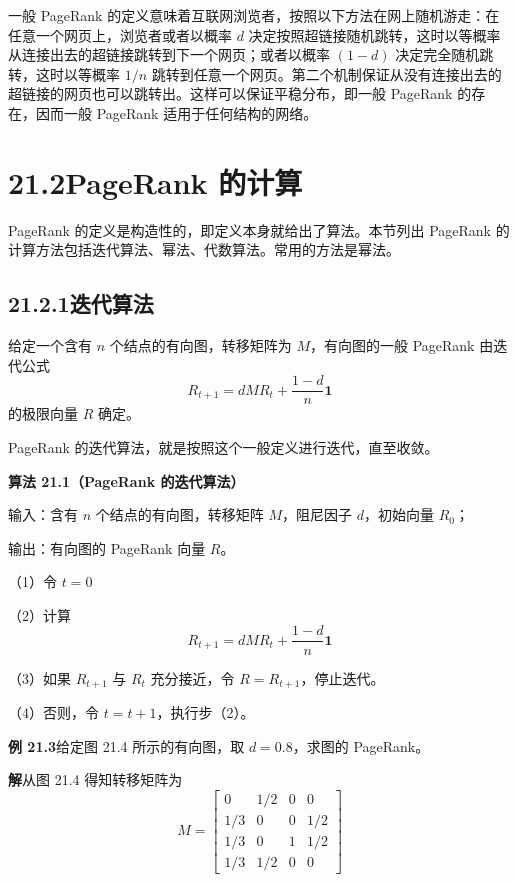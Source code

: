 \documentclass[UTF8,12pt,a4paper,fontset=fandol]{ctexart}
\begin{document}
一般 PageRank 的定义意味着互联网浏览者，按照以下方法在网上随机游走：在任意一个网页上，浏览者或者以概率 $d$ 决定按照超链接随机跳转，这时以等概率从连接出去的超链接跳转到下一个网页；或者以概率 $(1-d)$ 决定完全随机跳转，这时以等概率 $1/n$ 跳转到任意一个网页。第二个机制保证从没有连接出去的超链接的网页也可以跳转出。这样可以保证平稳分布，即一般 PageRank 的存在，因而一般 PageRank 适用于任何结构的网络。

\section*{21.2\quad PageRank 的计算}

PageRank 的定义是构造性的，即定义本身就给出了算法。本节列出 PageRank 的计算方法包括迭代算法、幂法、代数算法。常用的方法是幂法。

\subsection*{21.2.1\quad 迭代算法}

给定一个含有 $n$ 个结点的有向图，转移矩阵为 $M$，有向图的一般 PageRank 由迭代公式
\begin{equation}
R_{t+1}=dMR_t+\frac{1-d}{n}\mathbf{1}
\tag{21.15}
\end{equation}
的极限向量 $R$ 确定。

PageRank 的迭代算法，就是按照这个一般定义进行迭代，直至收敛。

\noindent\textbf{算法 21.1（PageRank 的迭代算法）}

输入：含有 $n$ 个结点的有向图，转移矩阵 $M$，阻尼因子 $d$，初始向量 $R_0$；

输出：有向图的 PageRank 向量 $R$。

（1）令 $t=0$

（2）计算
\[
R_{t+1}=dMR_t+\frac{1-d}{n}\mathbf{1}
\]

（3）如果 $R_{t+1}$ 与 $R_t$ 充分接近，令 $R=R_{t+1}$，停止迭代。

（4）否则，令 $t=t+1$，执行步（2）。

\noindent\textbf{例 21.3}\quad 给定图 21.4 所示的有向图，取 $d=0.8$，求图的 PageRank。

\noindent\textbf{解}\quad 从图 21.4 得知转移矩阵为
\[
M=
\begin{bmatrix}
0 & 1/2 & 0 & 0\\
1/3 & 0 & 0 & 1/2\\
1/3 & 0 & 1 & 1/2\\
1/3 & 1/2 & 0 & 0
\end{bmatrix}
\]
\end{document}
